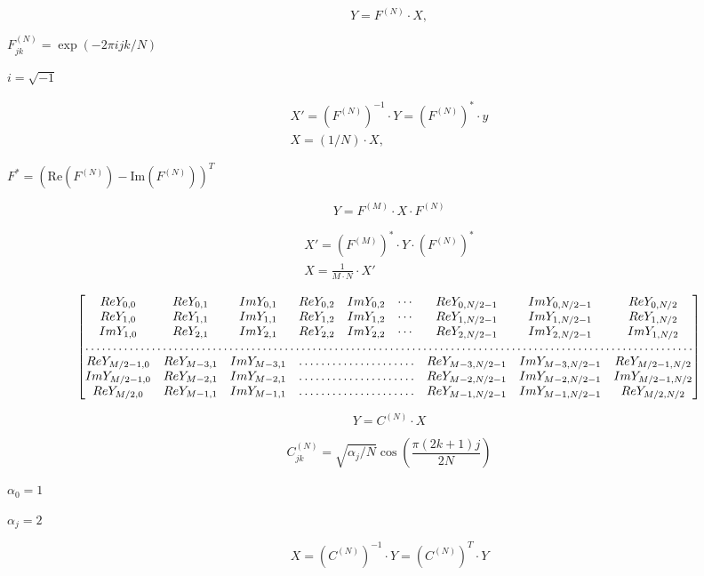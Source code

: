 \documentclass{article}
\begin{document}
\[Y = F^{(N)} \cdot X,\]
\pagebreak

$F^{(N)}_{jk}=\exp(-2\pi i j k/N)$
\pagebreak

$i=\sqrt{-1}$
\pagebreak

\[\begin{array}{l} X'= \left (F^{(N)} \right )^{-1} \cdot Y = \left (F^{(N)} \right )^* \cdot y \\ X = (1/N) \cdot X, \end{array}\]
\pagebreak

$F^*=\left(\textrm{Re}(F^{(N)})-\textrm{Im}(F^{(N)})\right)^T$
\pagebreak

\[Y = F^{(M)} \cdot X \cdot F^{(N)}\]
\pagebreak

\[\begin{array}{l} X'= \left (F^{(M)} \right )^* \cdot Y \cdot \left (F^{(N)} \right )^* \\ X = \frac{1}{M \cdot N} \cdot X' \end{array}\]
\pagebreak

\[\begin{bmatrix} Re Y_{0,0} & Re Y_{0,1} & Im Y_{0,1} & Re Y_{0,2} & Im Y_{0,2} & \cdots & Re Y_{0,N/2-1} & Im Y_{0,N/2-1} & Re Y_{0,N/2} \\ Re Y_{1,0} & Re Y_{1,1} & Im Y_{1,1} & Re Y_{1,2} & Im Y_{1,2} & \cdots & Re Y_{1,N/2-1} & Im Y_{1,N/2-1} & Re Y_{1,N/2} \\ Im Y_{1,0} & Re Y_{2,1} & Im Y_{2,1} & Re Y_{2,2} & Im Y_{2,2} & \cdots & Re Y_{2,N/2-1} & Im Y_{2,N/2-1} & Im Y_{1,N/2} \\ \hdotsfor{9} \\ Re Y_{M/2-1,0} & Re Y_{M-3,1} & Im Y_{M-3,1} & \hdotsfor{3} & Re Y_{M-3,N/2-1} & Im Y_{M-3,N/2-1}& Re Y_{M/2-1,N/2} \\ Im Y_{M/2-1,0} & Re Y_{M-2,1} & Im Y_{M-2,1} & \hdotsfor{3} & Re Y_{M-2,N/2-1} & Im Y_{M-2,N/2-1}& Im Y_{M/2-1,N/2} \\ Re Y_{M/2,0} & Re Y_{M-1,1} & Im Y_{M-1,1} & \hdotsfor{3} & Re Y_{M-1,N/2-1} & Im Y_{M-1,N/2-1}& Re Y_{M/2,N/2} \end{bmatrix}\]
\pagebreak

\[Y = C^{(N)} \cdot X\]
\pagebreak

\[C^{(N)}_{jk}= \sqrt{\alpha_j/N} \cos \left ( \frac{\pi(2k+1)j}{2N} \right )\]
\pagebreak

$\alpha_0=1$
\pagebreak

$\alpha_j=2$
\pagebreak

\[X = \left (C^{(N)} \right )^{-1} \cdot Y = \left (C^{(N)} \right )^T \cdot Y\]
\pagebreak
\end{document}
